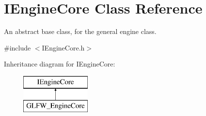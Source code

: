 \hypertarget{class_i_engine_core}{}\section{I\+Engine\+Core Class Reference}
\label{class_i_engine_core}


An abstract base class, for the general engine class.  




{\ttfamily \#include $<$I\+Engine\+Core.\+h$>$}

Inheritance diagram for I\+Engine\+Core\+:\begin{figure}[H]
\begin{center}
\leavevmode
\includegraphics[height=2.000000cm]{class_i_engine_core}
\end{center}
\end{figure}
